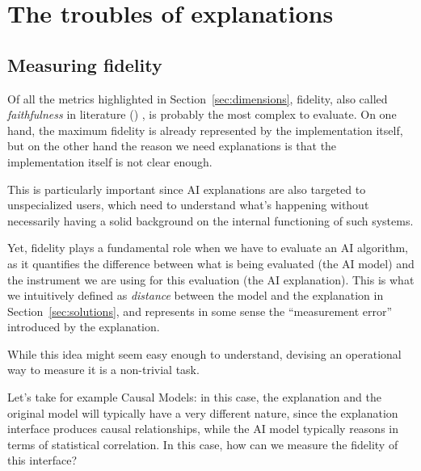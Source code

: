 \documentclass[conference]{IEEEtran}
\begin{document}
\section{The troubles of explanations}
\label{sec:troubles}

\subsection{Measuring fidelity}
\label{sec:fidelity}

Of all the metrics highlighted in Section~\ref{sec:dimensions}, fidelity, also
called \textit{faithfulness} in literature (\citet{explainingexpl}) , is
probably the most complex to evaluate. On one hand, the maximum fidelity is
already represented by the implementation itself, but on the other hand the
reason we need explanations is that the implementation itself is not clear
enough.

This is particularly important since AI explanations are also targeted to
unspecialized users, which need to understand what's happening without
necessarily having a solid background on the internal functioning of such
systems.

Yet, fidelity plays a fundamental role when we have to evaluate an AI algorithm,
as it quantifies the difference between what is being evaluated (the AI model)
and the instrument we are using for this evaluation (the AI explanation). This
is what we intuitively defined as \textit{distance} between the model and the
explanation in Section~\ref{sec:solutions}, and represents in some sense the
``measurement error'' introduced by the explanation.



While this idea might seem easy enough to understand, devising an operational
way to measure it is a non-trivial task.

Let's take for example Causal Models: in this case, the explanation and the
original model will typically have a very different nature, since the
explanation interface produces causal relationships, while the AI model
typically reasons in terms of statistical correlation. In this case, how can we
measure the fidelity of this interface?
\end{document}
